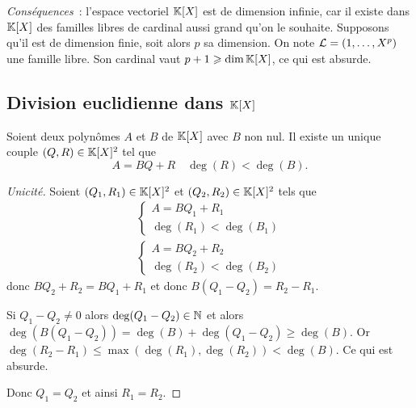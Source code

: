 \emph{Conséquences}~: l'espace vectoriel \(\mathbb{K}[X]\) est de dimension infinie, car 
il existe dans \(\mathbb{K}[X]\) des familles libres de cardinal aussi grand qu'on le 
souhaite. Supposons qu'il est de dimension finie, soit alors \(p\) sa dimension. 
On note \(\mathcal{L} = (1, \ldots, X^p)\) une famille libre. Son cardinal vaut \(p+1 
\geqslant \operatorname{dim} \mathbb{K}[X]\), ce qui est absurde.

\subsection{Division euclidienne dans \(\mathbb{K}[X]\)}

\begin{theo}
  Soient deux polynômes \(A\) et \(B\) de \(\mathbb{K}[X]\) avec \(B\) non nul. Il 
  existe un unique couple \((Q,R) \in \mathbb{K}[X]^2\) tel que
  \begin{equation}
    A = BQ+R \quad \deg(R) < \deg(B).
  \end{equation}
\end{theo}
\begin{proof}[Unicité]
  Soient \((Q_1,R_1) \in \mathbb{K}[X]^2\) et \((Q_2,R_2) \in \mathbb{K}[X]^2\) tels que
  \begin{align}
    \begin{cases}
      A = BQ_1+R_1 \\ \deg(R_1) < \deg(B_1)
    \end{cases}\\
    \begin{cases}
      A = BQ_2+R_2 \\ \deg(R_2) < \deg(B_2)
    \end{cases}
  \end{align}
  donc \(BQ_2+R_2 = BQ_1+R_1\) et donc \(B(Q_1-Q_2) = R_2-R_1\).

  Si \(Q_1-Q_2 \neq 0\) alors \(\deg(Q_1-Q_2) \in \mathbb{N}\) et alors 
  \(\deg(B(Q_1-Q_2)) = \deg(B) + \deg(Q_1-Q_2) \geqslant \deg(B)\). Or 
  \(\deg(R_2-R_1) \leqslant \max(\deg(R_1),\deg(R_2)) < \deg(B)\). Ce qui est 
  absurde. 

  Donc \(Q_1 = Q_2\) et ainsi \(R_1 = R_2\).
\end{proof}
